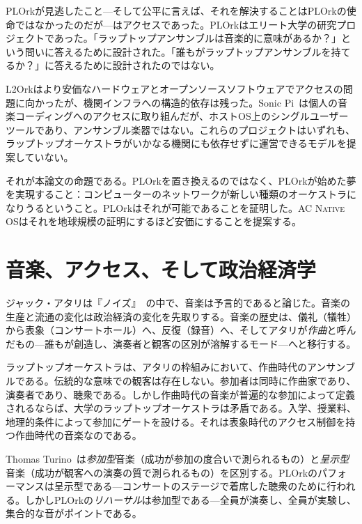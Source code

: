 \documentclass[10pt,letterpaper,twocolumn]{article}
\newcommand{\acos}{\textsc{AC Native OS}}
\begin{document}
PLOrkが見逃したこと---そして公平に言えば、それを解決することはPLOrkの使命ではなかったのだが---はアクセスであった。PLOrkはエリート大学の研究プロジェクトであった。「ラップトップアンサンブルは音楽的に意味があるか？」という問いに答えるために設計された。「誰もがラップトップアンサンブルを持てるか？」に答えるために設計されたのではない。

L2Orkはより安価なハードウェアとオープンソースソフトウェアでアクセスの問題に向かったが、機関インフラへの構造的依存は残った。Sonic Pi~\citep{aaron2016sonic}は個人の音楽コーディングへのアクセスに取り組んだが、ホストOS上のシングルユーザーツールであり、アンサンブル楽器ではない。これらのプロジェクトはいずれも、ラップトップオーケストラがいかなる機関にも依存せずに運営できるモデルを提案していない。

それが本論文の命題である。PLOrkを置き換えるのではなく、PLOrkが始めた夢を実現すること：コンピューターのネットワークが新しい種類のオーケストラになりうるということ。PLOrkはそれが可能であることを証明した。\acos{}はそれを地球規模の証明にするほど安価にすることを提案する。


\section{音楽、アクセス、そして政治経済学}
\label{sec:theory}

ジャック・アタリは『ノイズ』~\citep{attali1985noise}の中で、音楽は予言的であると論じた。音楽の生産と流通の変化は政治経済の変化を先取りする。音楽の歴史は、儀礼（犠牲）から表象（コンサートホール）へ、反復（録音）へ、そしてアタリが\emph{作曲}と呼んだもの---誰もが創造し、演奏者と観客の区別が溶解するモード---へと移行する。

ラップトップオーケストラは、アタリの枠組みにおいて、作曲時代のアンサンブルである。伝統的な意味での観客は存在しない。参加者は同時に作曲家であり、演奏者であり、聴衆である。しかし作曲時代の音楽が普遍的な参加によって定義されるならば、大学のラップトップオーケストラは矛盾である。入学、授業料、地理的条件によって参加にゲートを設ける。それは表象時代のアクセス制御を持つ作曲時代の音楽なのである。

Thomas Turino~\citep{turino2008music}は\emph{参加型}音楽（成功が参加の度合いで測られるもの）と\emph{呈示型}音楽（成功が観客への演奏の質で測られるもの）を区別する。PLOrkのパフォーマンスは呈示型である---コンサートのステージで着席した聴衆のために行われる。しかしPLOrkの\emph{リハーサル}は参加型である---全員が演奏し、全員が実験し、集合的な音がポイントである。
\end{document}
